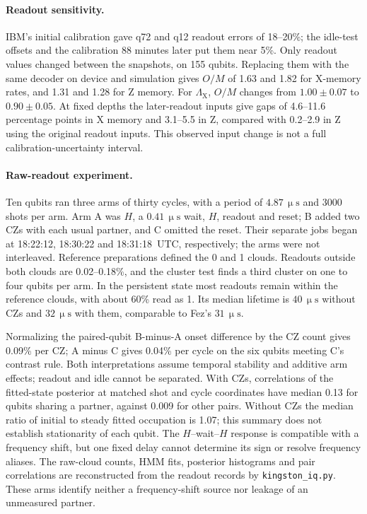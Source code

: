 \documentclass[aps,pra,reprint,nofootinbib,longbibliography,floatfix,showkeys]{revtex4-2}
\newcommand{\us}{\,\upmu\mathrm{s}}
\newcommand{\LX}{\Lambda_{\mathrm{X}}}
\begin{document}
\paragraph*{Readout sensitivity.}
IBM's initial calibration gave q72 and q12 readout errors of 18--20\%; the idle-test offsets and the calibration 88 minutes later put them near 5\%.
Only readout values changed between the snapshots, on 155 qubits.
Replacing them with the same decoder on device and simulation gives $O/M$ of 1.63 and 1.82 for X-memory rates, and 1.31 and 1.28 for Z memory.
For $\LX$, $O/M$ changes from $1.00\pm0.07$ to $0.90\pm0.05$.
At fixed depths the later-readout inputs give gaps of 4.6--11.6 percentage points in X memory and 3.1--5.5 in Z, compared with 0.2--2.9 in Z using the original readout inputs.
This observed input change is not a full calibration-uncertainty interval.

\paragraph*{Raw-readout experiment.}
Ten qubits ran three arms of thirty cycles, with a period of $4.87\us$ and 3000 shots per arm.
Arm A was $H$, a $0.41\us$ wait, $H$, readout and reset; B added two CZs with each usual partner, and C omitted the reset.
Their separate jobs began at 18:22:12, 18:30:22 and 18:31:18~UTC, respectively; the arms were not interleaved.
Reference preparations defined the 0 and 1 clouds.
Readouts outside both clouds are 0.02--0.18\%, and the cluster test finds a third cluster on one to four qubits per arm.
In the persistent state most readouts remain within the reference clouds, with about 60\% read as 1.
Its median lifetime is $40\us$ without CZs and $32\us$ with them, comparable to Fez's $31\us$.

Normalizing the paired-qubit B-minus-A onset difference by the CZ count gives 0.09\% per CZ; A minus C gives 0.04\% per cycle on the six qubits meeting C's contrast rule.
Both interpretations assume temporal stability and additive arm effects; readout and idle cannot be separated.
With CZs, correlations of the fitted-state posterior at matched shot and cycle coordinates have median 0.13 for qubits sharing a partner, against 0.009 for other pairs.
Without CZs the median ratio of initial to steady fitted occupation is 1.07; this summary does not establish stationarity of each qubit.
The $H$--wait--$H$ response is compatible with a frequency shift, but one fixed delay cannot determine its sign or resolve frequency aliases.
The raw-cloud counts, HMM fits, posterior histograms and pair correlations are reconstructed from the readout records by \texttt{kingston\_iq.py}.
These arms identify neither a frequency-shift source nor leakage of an unmeasured partner.
\end{document}
